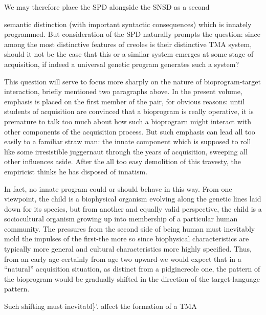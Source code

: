 We may therefore place the SPD alongside the SNSD as a second

semantic distinction (with important syntactic consequences) which is innately programmed. But consideration of the SPD naturally prompts the question: since among the most distinctive features of creoles is their distinctive TMA system, should it not be the case that this or a similar system emerges at some stage of acquisition, if indeed a uni\-versal genetic program generates such a system?

This question will serve to focus more sharply on the nature of bioprogram-target interaction, briefly mentioned two paragraphs above. In the present volume, emphasis is placed on the first member of the pair, for obvious reasons: until students of acquisition are convinced that a bioprogram is really operative, it is premature to talk too much about how such a bioprograrn might interact with other components of the acquisition process. But such emphasis can lead all too easily to a familiar straw man: the innate component which is supposed to roll like some irresistible juggernaut through the years of acquisition, sweeping all other influences aside. After the all too easy demolition of this travesty, the empiricist thinks he has disposed of innatism.

In fact, no innate program could or should behave in this way. From one viewpoint, the child is a biophysical organism evolving along the genetic lines laid down for its species, but from another and equally valid perspective, the child is a sociocultural organism growing up into membership of a particular human community. The pressures from the second side of being human must inevitably mold the impulses of the first-the more so since biophysical characteristics are typically more general and cultural characteristics more highly specified. Thus, from an early age-certainly from age two upward-we would expect that in a ``natural'' acquisition situation, as distinct from a pidgin\-creole one, the pattern of the bioprogram would be gradually shifted in the direction of the target-language pattern.

Such shifting must inevitabl\}'. affect the formation of a TMA


